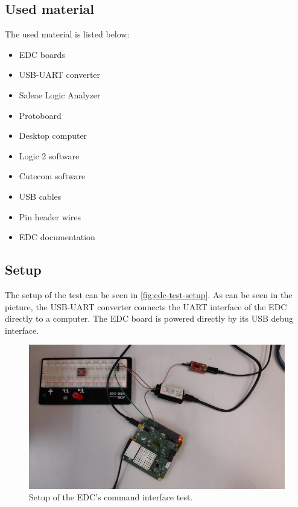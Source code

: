 \subsection{Used material}

The used material is listed below:

\begin{itemize}
    \item EDC boards
    \item USB-UART converter
    \item Saleae Logic Analyzer
    \item Protoboard
    \item Desktop computer
    \item Logic 2 software
    \item Cutecom software
    \item USB cables
    \item Pin header wires
    \item EDC documentation
\end{itemize}

\subsection{Setup}

The setup of the test can be seen in \autoref{fig:edc-test-setup}. As can be seen in the picture, the USB-UART converter connects the UART interface of the EDC directly to a computer. The EDC board is powered directly by its USB debug interface.

\begin{figure}[!ht]
    \begin{center}
        \includegraphics[width=\textwidth]{figures/edc_report/cmd-test-setup}
        \caption{Setup of the EDC's command interface test.}
        \label{fig:edc-test-setup}
    \end{center}
\end{figure}

